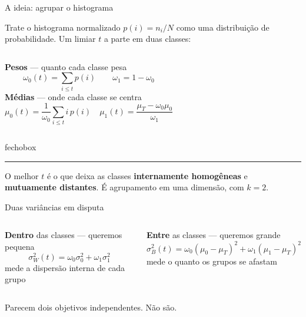 \documentclass[aspectratio=169,12pt]{beamer}
\newcommand{\sub}[1]{{\small\textcolor{cinza}{#1}}}
\newenvironment{fecho}
  {\begin{beamercolorbox}[wd=\textwidth, sep=.75em, leftskip=.6em]{fechobox}%
   \hspace{-.6em}\textcolor{brasa}{\rule[-.35em]{2.5pt}{1.15em}}\hspace{.5em}\ignorespaces}
  {\end{beamercolorbox}}
\begin{document}
\begin{frame}{A ideia: agrupar o histograma}

  Trate o histograma normalizado $p(i)=n_i/N$ como uma distribuição de
  probabilidade. Um limiar $t$ a parte em duas classes:

  \vspace{.5em}
  \begin{columns}[T,onlytextwidth]
      \textbf{Pesos} — quanto cada classe pesa
      \[
        \omega_0(t)=\sum_{i\le t} p(i)
        \qquad
        \omega_1 = 1-\omega_0
      \]
      \textbf{Médias} — onde cada classe se centra
      \[
        \mu_0(t)=\frac{1}{\omega_0}\sum_{i\le t} i\,p(i)
        \quad
        \mu_1(t)=\frac{\mu_T-\omega_0\mu_0}{\omega_1}
      \]
  \end{columns}

  \vspace{1em}
  \begin{fecho}
    O melhor $t$ é o que deixa as classes \textbf{internamente homogêneas} e
    \textbf{mutuamente distantes}. É agrupamento em uma dimensão, com $k=2$.
  \end{fecho}

\end{frame}

\begin{frame}{Duas variâncias em disputa}

  \begin{columns}[T,onlytextwidth]
      \textbf{Dentro} das classes — queremos \alert{pequena}
      \[
        \sigma_W^2(t)=\omega_0\sigma_0^2+\omega_1\sigma_1^2
      \]
      \sub{mede a dispersão interna de cada grupo}

      \textbf{Entre} as classes — queremos \alert{grande}
      \[
        \sigma_B^2(t)=\omega_0(\mu_0-\mu_T)^2+\omega_1(\mu_1-\mu_T)^2
      \]
      \sub{mede o quanto os grupos se afastam}
  \end{columns}

  \vspace{1.4em}
  Parecem dois objetivos independentes. Não são.

\end{frame}
\end{document}
